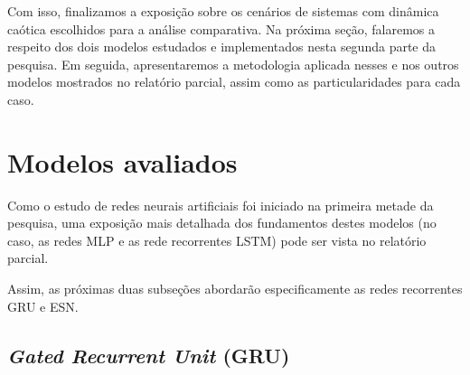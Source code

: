 \documentclass[a4paper, 12pt]{article}
\begin{document}
Com isso, finalizamos a exposição sobre os cenários de sistemas com dinâmica caótica escolhidos para a análise comparativa. Na próxima seção, falaremos a respeito dos dois modelos estudados e implementados nesta segunda parte da pesquisa. Em seguida, apresentaremos a metodologia aplicada nesses e nos outros modelos mostrados no relatório parcial, assim como as particularidades para cada caso.

\section{Modelos avaliados}

Como o estudo de redes neurais artificiais foi iniciado na primeira metade da pesquisa, uma exposição mais detalhada dos fundamentos destes modelos (no caso, as redes MLP e as rede recorrentes LSTM) pode ser vista no relatório parcial.

Assim, as próximas duas subseções abordarão especificamente as redes recorrentes GRU e ESN.

\subsection{\textit{Gated Recurrent Unit} (GRU)}
\end{document}
